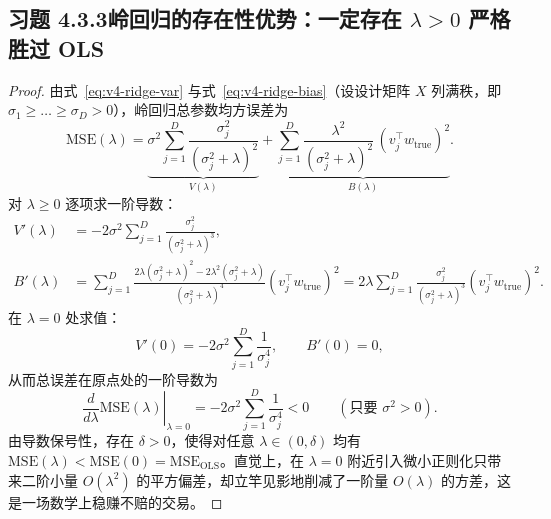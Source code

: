 \subsection*{习题 4.3.3\quad 岭回归的存在性优势：一定存在 $\lambda > 0$ 严格胜过 OLS}
\begin{proof}
由式~\eqref{eq:v4-ridge-var} 与式~\eqref{eq:v4-ridge-bias}（设设计矩阵 $X$ 列满秩，即 $\sigma_1 \ge \dots \ge \sigma_D > 0$），岭回归总参数均方误差为
\[
  \mathrm{MSE}(\lambda)
  = \underbrace{\sigma^2 \sum_{j=1}^D \frac{\sigma_j^2}{(\sigma_j^2 + \lambda)^2}}_{V(\lambda)}
  + \underbrace{\sum_{j=1}^D \frac{\lambda^2}{(\sigma_j^2 + \lambda)^2}\,(v_j^\top w_{\mathrm{true}})^2}_{B(\lambda)}.
\]
对 $\lambda \ge 0$ 逐项求一阶导数：
\begin{align*}
  V'(\lambda) &= -2\sigma^2 \sum_{j=1}^D \frac{\sigma_j^2}{(\sigma_j^2 + \lambda)^3}, \\
  B'(\lambda) &= \sum_{j=1}^D \frac{2\lambda(\sigma_j^2 + \lambda)^2 - 2\lambda^2(\sigma_j^2 + \lambda)}{(\sigma_j^2 + \lambda)^4}(v_j^\top w_{\mathrm{true}})^2
               = 2\lambda \sum_{j=1}^D \frac{\sigma_j^2}{(\sigma_j^2 + \lambda)^3}(v_j^\top w_{\mathrm{true}})^2.
\end{align*}
在 $\lambda = 0$ 处求值：
\[
  V'(0) = -2\sigma^2 \sum_{j=1}^D \frac{1}{\sigma_j^4}, \qquad
  B'(0) = 0,
\]
从而总误差在原点处的一阶导数为
\[
  \left.\frac{d}{d\lambda}\mathrm{MSE}(\lambda)\right|_{\lambda=0}
  = -2\sigma^2 \sum_{j=1}^D \frac{1}{\sigma_j^4} < 0 \qquad (\text{只要 }\sigma^2 > 0).
\]
由导数保号性，存在 $\delta > 0$，使得对任意 $\lambda \in (0, \delta)$ 均有 $\mathrm{MSE}(\lambda) < \mathrm{MSE}(0) = \mathrm{MSE}_{\mathrm{OLS}}$。直觉上，在 $\lambda = 0$ 附近引入微小正则化只带来二阶小量 $O(\lambda^2)$ 的平方偏差，却立竿见影地削减了一阶量 $O(\lambda)$ 的方差，这是一场数学上稳赚不赔的交易。
\end{proof}

